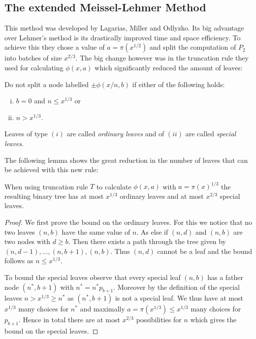\subsection{The extended Meissel-Lehmer Method}\label{sec:lmo}
This method was developed by Lagarias, Miller and Odlyzko. 
Its big advantage over Lehmer's method is its drastically improved time and space efficiency. To achieve this 
they chose a value of $a = \pi(x^{1/2})$ and split the computation of $P_{2}$ into batches of size $x^{2 / 3}$.
The big change however was in the truncation rule they used for calculating $\phi(x,a)$ which significantly reduced the amount of leaves:

\begin{definition}
	Do not split a node labelled $\pm \phi(x / n,b)$ if either of the following holds:
	\begin{enumerate}[(i)]
		\item $b=0$ and $n \leq x^{1 / 3}$ or
		\item $n > x^{1 / 3}$.
	\end{enumerate}
	Leaves of type $(i)$ are called \emph{ordinary leaves} and of $(ii)$ are called \emph{special leaves}.
\end{definition}
The following lemma shows the great reduction in the number of leaves that can be achieved with this new rule:

\begin{lemma}
	When using truncation rule $T$ to calculate $\phi(x,a)$ with $a = \pi(x)^{1 / 3}$ the resulting binary tree has at most $x^{1 / 3}$ ordinary leaves 
	and at most $x^{2 / 3}$ special leaves.
\end{lemma}

\begin{proof}
	We first prove the bound on the ordinary leaves. For this we notice that no two leaves $(n,b)$ have the same value of $n$.
	As else if $(n,d)$ and $(n,b)$ are two nodes with $d \geq b$. Then there exists a path through the tree
	given by $(n,d-1), \ldots, (n,b+1), (n,b)$. Thus $(n,d)$ cannot be a leaf and the bound follows as $n \leq x^{1 /3}$.

	To bound the special leaves observe that every special leaf $(n,b)$ has a father node $(n^{*},b+1)$ with
	$n^{*} = n^{*} p_{b+1}$.
	Moreover by the definition of the special leaves $n > x^{1 /3} \geq n^{*}$ as $(n^{*},b+1)$ is not a special leaf.
	We thus have at most $x^{1 /3}$ many choices for $n^{*}$ and maximally $a = \pi(x^{1 / 3}) \leq x^{1/3}$ many choices for $p_{b+1}$.
	Hence in total there are at most $x^{2 / 3}$ possibilities for $n$ which gives the bound on the special leaves.
\end{proof}

